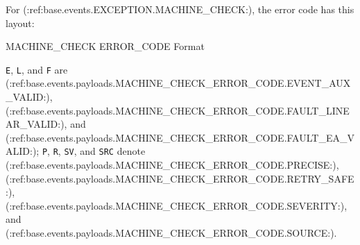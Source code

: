 For (:ref:base.events.EXCEPTION.MACHINE_CHECK:), the error code has this layout:

\begin{BedrockListedFormatDiagram}{MACHINE\_CHECK ERROR\_CODE Format}
\end{BedrockListedFormatDiagram}
{\small
\texttt{E}, \texttt{L}, and \texttt{F} are (:ref:base.events.payloads.MACHINE_CHECK_ERROR_CODE.EVENT_AUX_VALID:),
(:ref:base.events.payloads.MACHINE_CHECK_ERROR_CODE.FAULT_LINEAR_VALID:), and (:ref:base.events.payloads.MACHINE_CHECK_ERROR_CODE.FAULT_EA_VALID:);
\texttt{P}, \texttt{R}, \texttt{SV}, and \texttt{SRC} denote (:ref:base.events.payloads.MACHINE_CHECK_ERROR_CODE.PRECISE:),
(:ref:base.events.payloads.MACHINE_CHECK_ERROR_CODE.RETRY_SAFE:), (:ref:base.events.payloads.MACHINE_CHECK_ERROR_CODE.SEVERITY:), and (:ref:base.events.payloads.MACHINE_CHECK_ERROR_CODE.SOURCE:).
\par}

